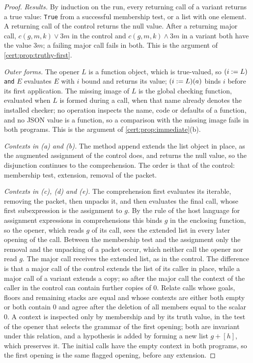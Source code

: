\begin{proof}
\emph{Results.} By induction on the run, every returning call of a variant
returns a true value: \texttt{True} from a successful membership test, or a
list with one element. A returning call of the control returns the null value.
After a returning major call, $c(g,m,k)\lor 3m$ in the control and
$c(g,m,k)\land 3m$ in a variant both have the value $3m$; a failing major call
fails in both. This is the argument of \cref{cert:prop:truthy-first}.

\emph{Outer forms.} The opener $L$ is a function object, which is true-valued,
so $(i\mathrel{:=} L)$ \texttt{and} $E$ evaluates $E$ with $i$ bound and returns its
value; $(i\mathrel{:=} L)(a)$ binds $i$ before its first application. The missing
image of $L$ is the global checking function, evaluated when $L$ is formed
during a call, when that name already denotes the installed checker; no
operation inspects the name, code or defaults of a function, and no JSON value
is a function, so a comparison with the missing image fails in both programs.
This is the argument of \cref{cert:prop:immediate}(b).

\emph{Contexts in (a) and (b).} The method $\mathrm{append}$ extends the list
object in place, as the augmented assignment of the control does, and returns
the null value, so the disjunction continues to the comprehension. The order is
that of the control: membership test, extension, removal of the packet.

\emph{Contexts in (c), (d) and (e).} The comprehension first evaluates its
iterable, removing the packet, then unpacks it, and then evaluates the final
call, whose first subexpression is the assignment to $g$. By the rule of the
host language for assignment expressions in comprehensions this binds $g$ in
the enclosing function, so the opener, which reads $g$ of its call, sees the
extended list in every later opening of the call. Between the membership test
and the assignment only the removal and the unpacking of a packet occur, which
neither call the opener nor read $g$. The major call receives the extended
list, as in the control. The difference is that a major call of the control
extends the list of its caller in place, while a major call of a variant
extends a copy; so after the major call the context of the caller in the
control can contain further copies of $0$. Relate calls whose goals, floors and
remaining stacks are equal and whose contexts are either both empty or both
contain $0$ and agree after the deletion of all members equal to the scalar
$0$. A context is inspected only by membership and by its truth value, in the
test of the opener that selects the grammar of the first opening; both are
invariant under this relation, and a hypothesis is added by forming a new list
$g+[h]$, which preserves it. The initial calls have the empty context in both
programs, so the first opening is the same flagged opening, before any
extension.


\end{proof}
